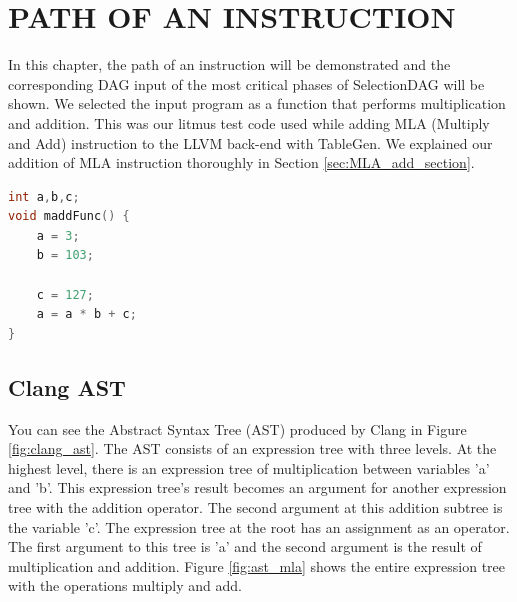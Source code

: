 
\clearpage
\chapter{PATH OF AN INSTRUCTION}\label{Ch4}
In this chapter, the path of an instruction will be demonstrated and the corresponding DAG input of the most critical phases of SelectionDAG will be shown. We selected the input program as a function that performs multiplication and addition. This was our litmus test code used while adding MLA (Multiply and Add) instruction to the LLVM back-end with TableGen. We explained our addition of MLA instruction thoroughly in Section \ref{sec:MLA_add_section}. 

\begin{lstlisting}[language=C, caption=madd.c program]
int a,b,c;
void maddFunc() {
	a = 3;
	b = 103;
	
	c = 127;
	a = a * b + c;
}
\end{lstlisting}

\section{Clang AST}
You can see the Abstract Syntax Tree (AST) produced by Clang in Figure \ref{fig:clang_ast}. The AST consists of an expression tree with three levels. At the highest level, there is an expression tree of multiplication between variables 'a' and 'b'. This expression tree's result becomes an argument for another expression tree with the addition operator. The second argument at this addition subtree is the variable 'c'. The expression tree at the root has an assignment as an operator. The first argument to this tree is 'a' and the second argument is the result of multiplication and addition. Figure \ref{fig:ast_mla} shows the entire expression tree with the operations multiply and add. 

